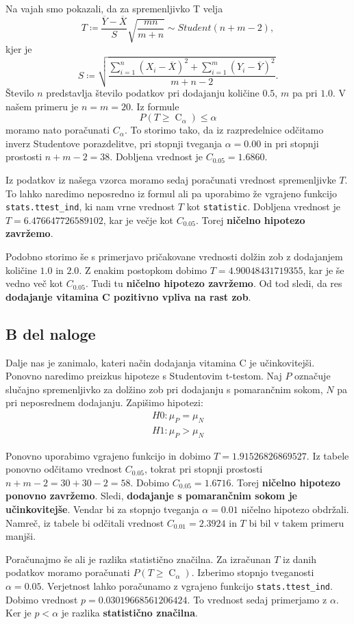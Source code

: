 \documentclass{article}
\DeclareMathOperator{\CM}{C}
\begin{document}
Na vajah smo pokazali, da za spremenljivko T velja
    \[
        T \coloneqq \frac{\overline{Y} - \overline{X}}{S}\sqrt{\frac{mn}{m + n}} \sim Student(n + m - 2),
    \]
    kjer je
    \[
        S \coloneqq \sqrt{\frac{\sum_{i = 1}^n (X_{i} - \overline{X})^2 + \sum_{i = 1}^m (Y_{i} - \overline{Y})^2}{m + n - 2}}.
    \]
Število $n$ predstavlja število podatkov pri dodajanju količine $0.5$, $m$ pa pri $1.0$. V našem primeru je $n=m=20$.
Iz formule
\[
        P(T \geq \CM_{\alpha}) \leq \alpha 
    \]
moramo nato poračunati $C_{\alpha}$. To storimo tako, da iz razpredelnice odčitamo inverz Studentove porazdelitve,
pri stopnji tveganja $\alpha = 0.00$ in pri stopnji prostosti $n + m -2 = 38$.
Dobljena vrednost je $C_{0.05} = 1.6860$.

Iz podatkov iz našega vzorca moramo sedaj poračunati vrednost spremenljivke $T$. To lahko naredimo 
neposredno iz formul ali pa uporabimo že vgrajeno funkcijo \texttt{stats.ttest\_ind},
ki nam vrne vrednost $T$ kot \texttt{statistic}. Dobljena vrednost je $T=6.476647726589102$, 
kar je večje kot $C_{0.05}$. Torej \textbf{ničelno hipotezo zavržemo}.

Podobno storimo še s primerjavo pričakovane vrednosti dolžin zob z dodajanjem količine $1.0$ in $2.0$.
Z enakim postopkom dobimo $T = 4.90048431719355$, kar je še vedno več kot $C_{0.05}$. Tudi tu \textbf{ničelno hipotezo 
zavržemo}. Od tod sledi, da res \textbf{dodajanje vitamina C pozitivno vpliva na rast zob}.


\subsection{B del naloge}
Dalje nas je zanimalo, kateri način dodajanja vitamina C je učinkovitejši. Ponovno naredimo preizkus hipoteze s
Studentovim t-testom.
Naj $P$ označuje slučajno spremenljivko za dolžino zob pri dodajanju s pomarančnim sokom, $N$ pa pri neposrednem dodajanju.
Zapišimo hipotezi:
\begin{align}
    H0: \mu_P = \mu_N \\
    H1: \mu_P > \mu_N
\end{align}

Ponovno uporabimo vgrajeno funkcijo in dobimo $T = 1.91526826869527$.
Iz tabele ponovno odčitamo vrednost $C_{0.05}$, tokrat pri stopnji prostosti
$n + m - 2= 30 + 30 - 2 = 58$. Dobimo $C_{0.05} = 1.6716$. 
Torej \textbf{ničelno hipotezo ponovno zavržemo}. Sledi, \textbf{dodajanje s pomarančnim sokom je učinkovitejše}.
Vendar bi za stopnjo tveganja $\alpha=0.01$ ničelno hipotezo obdržali. Namreč, iz tabele bi 
odčitali vrednost $C_{0.01} = 2.3924$ in $T$ bi bil v takem primeru manjši.

Poračunajmo še ali je razlika statistično značilna. Za izračunan $T$ iz danih podatkov moramo 
poračunati $P(T \geq \CM_{\alpha})$. Izberimo stopnjo tveganosti $\alpha = 0.05$.
Verjetnost lahko poračunamo z vgrajeno funkcijo \texttt{stats.ttest\_ind}.
Dobimo vrednost $p=0.03019668561206424$. To vrednost sedaj primerjamo z $\alpha$. Ker je 
$p < \alpha$ je razlika \textbf{statistično značilna}.
\end{document}
